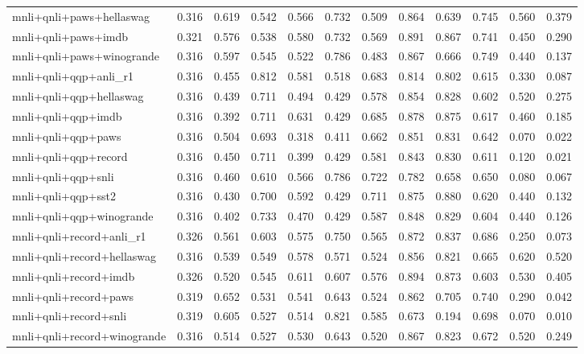 \begin{table}[t]
\begin{tabular}{lrrrrrrrrrrr}
    mnli+qnli+paws+hellaswag & 0.316 & 0.619 & 0.542 & 0.566 & 0.732 & 0.509 & 0.864 & 0.639 & 0.745 & 0.560 & 0.379 \\
    mnli+qnli+paws+imdb & 0.321 & 0.576 & 0.538 & 0.580 & 0.732 & 0.569 & 0.891 & 0.867 & 0.741 & 0.450 & 0.290 \\
    mnli+qnli+paws+winogrande & 0.316 & 0.597 & 0.545 & 0.522 & 0.786 & 0.483 & 0.867 & 0.666 & 0.749 & 0.440 & 0.137 \\
    mnli+qnli+qqp+anli\_r1 & 0.316 & 0.455 & 0.812 & 0.581 & 0.518 & 0.683 & 0.814 & 0.802 & 0.615 & 0.330 & 0.087 \\
    mnli+qnli+qqp+hellaswag & 0.316 & 0.439 & 0.711 & 0.494 & 0.429 & 0.578 & 0.854 & 0.828 & 0.602 & 0.520 & 0.275 \\
    mnli+qnli+qqp+imdb & 0.316 & 0.392 & 0.711 & 0.631 & 0.429 & 0.685 & 0.878 & 0.875 & 0.617 & 0.460 & 0.185 \\
    mnli+qnli+qqp+paws & 0.316 & 0.504 & 0.693 & 0.318 & 0.411 & 0.662 & 0.851 & 0.831 & 0.642 & 0.070 & 0.022 \\
    mnli+qnli+qqp+record & 0.316 & 0.450 & 0.711 & 0.399 & 0.429 & 0.581 & 0.843 & 0.830 & 0.611 & 0.120 & 0.021 \\
    mnli+qnli+qqp+snli & 0.316 & 0.460 & 0.610 & 0.566 & 0.786 & 0.722 & 0.782 & 0.658 & 0.650 & 0.080 & 0.067 \\
    mnli+qnli+qqp+sst2 & 0.316 & 0.430 & 0.700 & 0.592 & 0.429 & 0.711 & 0.875 & 0.880 & 0.620 & 0.440 & 0.132 \\
    mnli+qnli+qqp+winogrande & 0.316 & 0.402 & 0.733 & 0.470 & 0.429 & 0.587 & 0.848 & 0.829 & 0.604 & 0.440 & 0.126 \\
    mnli+qnli+record+anli\_r1 & 0.326 & 0.561 & 0.603 & 0.575 & 0.750 & 0.565 & 0.872 & 0.837 & 0.686 & 0.250 & 0.073 \\
    mnli+qnli+record+hellaswag & 0.316 & 0.539 & 0.549 & 0.578 & 0.571 & 0.524 & 0.856 & 0.821 & 0.665 & 0.620 & 0.520 \\
    mnli+qnli+record+imdb & 0.326 & 0.520 & 0.545 & 0.611 & 0.607 & 0.576 & 0.894 & 0.873 & 0.603 & 0.530 & 0.405 \\
    mnli+qnli+record+paws & 0.319 & 0.652 & 0.531 & 0.541 & 0.643 & 0.524 & 0.862 & 0.705 & 0.740 & 0.290 & 0.042 \\
    mnli+qnli+record+snli & 0.319 & 0.605 & 0.527 & 0.514 & 0.821 & 0.585 & 0.673 & 0.194 & 0.698 & 0.070 & 0.010 \\
    mnli+qnli+record+winogrande & 0.316 & 0.514 & 0.527 & 0.530 & 0.643 & 0.520 & 0.867 & 0.823 & 0.672 & 0.520 & 0.249 \\

\end{tabular}
\end{table}
